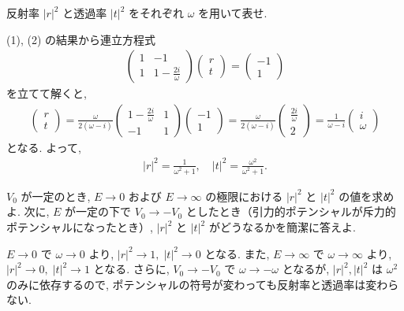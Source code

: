 \documentclass[../../ou-physics-exam.tex]{subfiles}
\begin{document}
反射率 $ |r|^2 $ と透過率 $ |t|^2 $ をそれぞれ $ \omega $ を用いて表せ.
\begin{answer}
    (1), (2) の結果から連立方程式
    \begin{align*}
        \begin{pmatrix}
            1 & -1 \\
            1 & 1 - \frac{2i}{\omega}
        \end{pmatrix}
        \begin{pmatrix}
            r \\ t
        \end{pmatrix} = 
        \begin{pmatrix}
            -1 \\ 1
        \end{pmatrix}
    \end{align*}
    を立てて解くと,
    \begin{align*}
        \begin{pmatrix}
            r \\ t
        \end{pmatrix}
        = \frac{\omega}{2(\omega - i)}
        \begin{pmatrix}
            1 - \frac{2i}{\omega} & 1 \\
            -1 & 1
        \end{pmatrix}
        \begin{pmatrix}
            -1 \\ 1
        \end{pmatrix}
        = \frac{\omega}{2(\omega - i)}
        \begin{pmatrix}
            \frac{2i}{\omega} \\ 2
        \end{pmatrix}
        = \frac{1}{\omega - i}
        \begin{pmatrix}
            i \\ \omega
        \end{pmatrix}
    \end{align*}
    となる. 
    よって,
    \begin{align*}
        |r|^2 = \frac{1}{\omega^2 + 1} , \quad |t|^2 = \frac{\omega^2}{\omega^2 + 1}.
    \end{align*}
\end{answer}

$ V_0 $ が一定のとき, $ E \to 0 $ および $ E \to \infty $ の極限における $ |r|^2 $ と $ |t|^2 $ の値を求めよ. 
次に, $ E $ が一定の下で $ V_0 \to - V_0 $ としたとき（引力的ポテンシャルが斥力的ポテンシャルになったとき）, $ |r|^2 $ と $ |t|^2 $ がどうなるかを簡潔に答えよ.
\begin{answer}
    $ E \to 0 $ で $ \omega \to 0 $ より, $ |r|^2 \to 1, \; |t|^2 \to 0 $ となる. 
    また, $ E \to \infty $ で $ \omega \to \infty $ より, $ |r|^2 \to 0, \; |t|^2 \to 1 $ となる. 
    さらに, $ V_0 \to -V_0 $ で $ \omega \to - \omega $ となるが, $ |r|^2, |t|^2 $ は $ \omega^2 $ のみに依存するので, ポテンシャルの符号が変わっても反射率と透過率は変わらない.
\end{answer}
\end{document}
